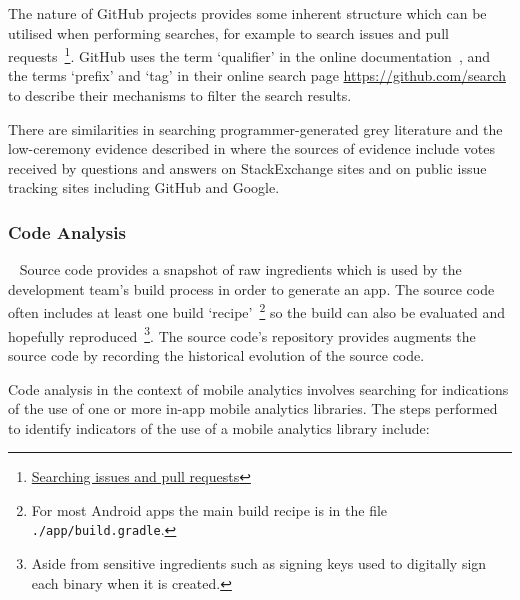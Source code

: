 The nature of GitHub projects provides some inherent structure which can be utilised when performing searches, for example to search issues and pull requests~\footnote{\href{https://docs.github.com/en/search-github/searching-on-github/searching-issues-and-pull-requests}{Searching issues and pull requests}}. GitHub uses the term `qualifier' in the online documentation~\citep{github2021_searching_code_github_docs}, and the terms `prefix' and `tag' in their online search page \url{https://github.com/search} to describe their mechanisms to filter the search results. 



There are similarities in searching programmer-generated grey literature and the low-ceremony evidence described in \citet{scaffidi2007_toawards_a_calculus_of_confidence, scaffidi2007developing} where the sources of evidence include votes received by questions and answers on StackExchange sites and on public issue tracking sites including GitHub and Google. %

\subsubsection{Code Analysis}~\label{section-code-analysis-research-method}   
Source code provides a snapshot of raw ingredients which is used by the development team's build process in order to generate an app. The source code often includes at least one build `recipe'~\footnote{For most Android apps the main build recipe is in the file \texttt{./app/build.gradle}.} so the build can also be evaluated and hopefully reproduced~\footnote{Aside from sensitive ingredients such as signing keys used to digitally sign each binary when it is created.}. The source code's repository provides augments the source code by recording the historical evolution of the source code.

Code analysis in the context of mobile analytics involves searching for indications of the use of one or more in-app mobile analytics libraries. The steps performed to identify indicators %
of the use of a mobile analytics library include:

